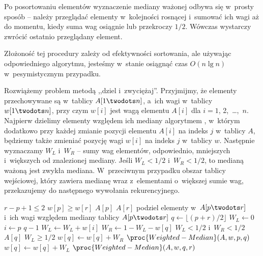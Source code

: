 \subproblem %
Po posortowaniu elementów wyznaczenie mediany ważonej odbywa się w~prosty sposób -- należy przeglądać elementy w~kolejności rosnącej i~sumować ich wagi aż do momentu, kiedy suma wag osiągnie lub przekroczy $1/2$. Wówczas wystarczy zwrócić ostatnio przeglądany element.

Złożoność tej procedury zależy od efektywności sortowania, ale używając odpowiedniego algorytmu, jesteśmy w~stanie osiągnąć czas $O(n\lg n)$ w~pesymistycznym przypadku.

\subproblem %
Rozwiążemy problem metodą ,,dziel i~zwyciężaj''. Przyjmijmy, że elementy przechowywane są w~tablicy $A[1\twodots n]$, a~ich wagi w~tablicy $w[1\twodots n]$, przy czym $w[i]$ jest wagą elementu $A[i]$ dla $i=1$, 2,~\dots,~$n$. Najpierw dzielimy elementy względem ich mediany algorytmem , w~którym dodatkowo przy każdej zmianie pozycji elementu $A[i]$ na indeks $j$ w~tablicy $A$, będziemy także zmieniać pozycję wagi $w[i]$ na indeks $j$ w~tablicy $w$. Następnie wyznaczamy $W_L$ i~$W_R$ -- sumy wag elementów, odpowiednio, mniejszych i~większych od znalezionej mediany. Jeśli $W_L<1/2$ i~$W_R<1/2$, to medianą ważoną jest zwykła mediana. W~przeciwnym przypadku obszar tablicy wejściowej, który zawiera medianę wraz z~elementami o~większej sumie wag, przekazujemy do następnego wywołania rekurencyjnego.
\begin{codebox}
\li	\If $r-p+1\le2$ \label{li:weighted-median-boundary-case-begin}
\li		\Then
			\If $w[p]\ge w[r]$
\li				\Then \Return $A[p]$
\li				\Else \Return $A[r]$
				\End \label{li:weighted-median-boundary-case-end}
		\End
\li	podziel elementy w~$A[p\twodots r]$ i~ich wagi względem mediany tablicy $A[p\twodots r]$ \label{li:weighted-median-partition}
\li	$q\gets\lfloor(p+r)/2\rfloor$
\li	$W_L\gets0$
\li	\For $i\gets p$ \To $q-1$
\li		\Do $W_L\gets W_L+w[i]$
		\End
\li	$W_R\gets1-W_L-w[q]$
\li	\If $W_L<1/2$ i~$W_R<1/2$
\li		\Then \Return $A[q]$
		\End
\li	\If $W_L\ge1/2$
\li		\Then
			$w[q]\gets w[q]+W_R$
\li			\Return $\proc{Weighted-Median}(A,w,p,q)$
\li		\Else
			$w[q]\gets w[q]+W_L$
\li			\Return $\proc{Weighted-Median}(A,w,q,r)$
		\End
\end{codebox}

